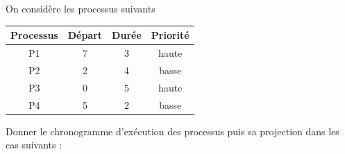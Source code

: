 \documentclass[a4paper,12pt,french]{article}
\begin{document}
\\

\exo{}\\

On considère les processus suivants
\begin{center}
\begin{tabular}{|c|c|c|c|}
\hline\rowcolor{UGLiOrange}
\textbf{\color{white} Processus} & \textbf{\color{white}Départ} & \textbf{\color{white}Durée} & \textbf{\color{white}Priorité} \\
\hline
P1 & 7 & 3 & haute \\
\hline
P2 & 2 & 4 & basse \\
\hline
P3 & 0 & 5 & haute \\
\hline
P4 & 5 & 2 & basse \\
\hline
\end{tabular}
\end{center}
Donner le chronogramme d'exécution des processus puis sa projection dans les cas suivants :
\end{document}
